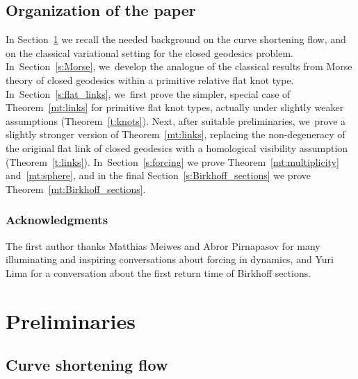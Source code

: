 \documentclass[11pt]{article}
\theoremstyle{plain}
\theoremstyle{definition}
\begin{document}
\subsection{Organization of the paper}
In Section~\ref{s:preliminaries} we recall the needed background on the curve shortening flow, and on the classical variational setting for the closed geodesics problem. In~Section~\ref{s:Morse}, we~develop the analogue of the classical results from Morse theory of closed geodesics within a primitive relative flat knot type. In~Section~\ref{s:flat_links}, we~first prove the simpler, special case of Theorem~\ref{mt:links} for primitive flat knot types, actually under slightly weaker assumptions (Theorem~\ref{t:knots}). Next, after suitable preliminaries, we~prove a slightly stronger version of Theorem~\ref{mt:links}, replacing the non-degeneracy of the original flat link of closed geodesics with a homological visibility assumption (Theorem~\ref{t:links}). In~Section~\ref{s:forcing} we prove Theorem~\ref{mt:multiplicity} and~\ref{mt:sphere}, and in the final Section~\ref{s:Birkhoff_sections} we prove Theorem~\ref{mt:Birkhoff_sections}.

\subsubsection*{Acknowledgments}
The first author thanks Matthias Meiwes and Abror
Pirnapasov for many illuminating and inspiring conversations about forcing in dynamics, and Yuri Lima for a conversation about the first return time of Birkhoff sections.

\section{Preliminaries}\label{s:preliminaries}

\subsection{Curve shortening flow}
\label{ss:curve_shortening}
\end{document}
